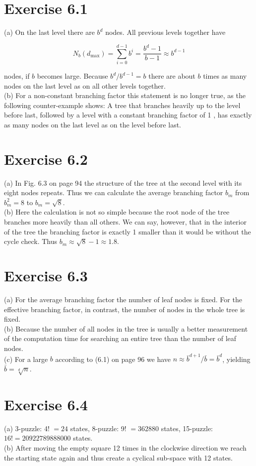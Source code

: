 \documentclass[10pt]{book}
\begin{document}
\begin{center}
\begin{enumerate}
\begin{center}
\begin{center}
\begin{center}
\begin{center}
\begin{center}
\section*{Exercise 6.1}
(a) On the last level there are $b^{d}$ nodes. All previous levels together have

$$
N_{b}\left(d_{\max }\right)=\sum_{i=0}^{d-1} b^{i}=\frac{b^{d}-1}{b-1} \approx b^{d-1}
$$

nodes, if $b$ becomes large. Because $b^{d} / b^{d-1}=b$ there are about $b$ times as many nodes on the last level as on all other levels together.\\
(b) For a non-constant branching factor this statement is no longer true, as the following counter-example shows: A tree that branches heavily up to the level before last, followed by a level with a constant branching factor of 1 , has exactly as many nodes on the last level as on the level before last.

\section*{Exercise 6.2}
(a) In Fig. 6.3 on page 94 the structure of the tree at the second level with its eight nodes repeats. Thus we can calculate the average branching factor $b_{m}$ from $b_{m}^{2}=8$ to $b_{m}=\sqrt{8}$.\\
(b) Here the calculation is not so simple because the root node of the tree branches more heavily than all others. We can say, however, that in the interior of the tree the branching factor is exactly 1 smaller than it would be without the cycle check. Thus $b_{m} \approx \sqrt{8}-1 \approx 1.8$.

\section*{Exercise 6.3}
(a) For the average branching factor the number of leaf nodes is fixed. For the effective branching factor, in contrast, the number of nodes in the whole tree is fixed.\\
(b) Because the number of all nodes in the tree is usually a better measurement of the computation time for searching an entire tree than the number of leaf nodes.\\
(c) For a large $b$ according to (6.1) on page 96 we have $n \approx \bar{b}^{d+1} / \bar{b}=\bar{b}^{d}$, yielding $\bar{b}=\sqrt[d]{n}$.

\section*{Exercise 6.4}
(a) 3-puzzle: 4! $=24$ states, 8-puzzle: 9! $=362880$ states, 15-puzzle: $16!=20922789888000$ states.\\
(b) After moving the empty square 12 times in the clockwise direction we reach the starting state again and thus create a cyclical sub-space with 12 states.


\end{center}
\end{center}
\end{center}
\end{center}
\end{center}
\end{enumerate}
\end{center}
\end{document}
